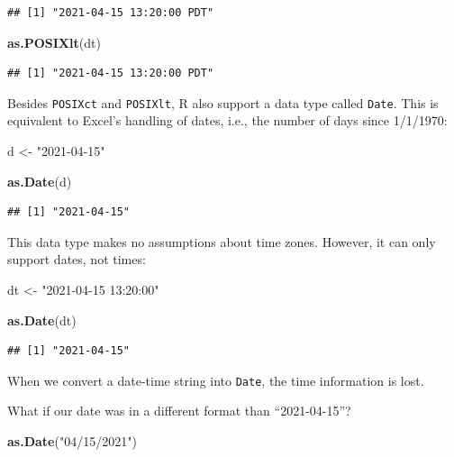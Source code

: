 \documentclass[
]{book}
\newenvironment{Shaded}{\begin{snugshade}}{\end{snugshade}}
\newcommand{\FunctionTok}[1]{\textcolor[rgb]{0.13,0.29,0.53}{\textbf{#1}}}
\newcommand{\NormalTok}[1]{#1}
\newcommand{\OtherTok}[1]{\textcolor[rgb]{0.56,0.35,0.01}{#1}}
\newcommand{\StringTok}[1]{\textcolor[rgb]{0.31,0.60,0.02}{#1}}
\begin{document}
\begin{verbatim}
## [1] "2021-04-15 13:20:00 PDT"
\end{verbatim}

\begin{Shaded}
\begin{Highlighting}[]
\FunctionTok{as.POSIXlt}\NormalTok{(dt)}
\end{Highlighting}
\end{Shaded}

\begin{verbatim}
## [1] "2021-04-15 13:20:00 PDT"
\end{verbatim}

Besides \texttt{POSIXct} and \texttt{POSIXlt}, R also support a data type called \texttt{Date}. This is equivalent to Excel's handling of dates, i.e., the number of days since 1/1/1970:

\begin{Shaded}
\begin{Highlighting}[]
\NormalTok{d }\OtherTok{\textless{}{-}} \StringTok{"2021{-}04{-}15"}

\FunctionTok{as.Date}\NormalTok{(d)}
\end{Highlighting}
\end{Shaded}

\begin{verbatim}
## [1] "2021-04-15"
\end{verbatim}

This data type makes no assumptions about time zones. However, it can only support dates, not times:

\begin{Shaded}
\begin{Highlighting}[]
\NormalTok{dt }\OtherTok{\textless{}{-}} \StringTok{"2021{-}04{-}15 13:20:00"}

\FunctionTok{as.Date}\NormalTok{(dt)}
\end{Highlighting}
\end{Shaded}

\begin{verbatim}
## [1] "2021-04-15"
\end{verbatim}

When we convert a date-time string into \texttt{Date}, the time information is lost.

What if our date was in a different format than ``2021-04-15''?

\begin{Shaded}
\begin{Highlighting}[]
\FunctionTok{as.Date}\NormalTok{(}\StringTok{"04/15/2021"}\NormalTok{)}
\end{Highlighting}
\end{Shaded}
\end{document}
